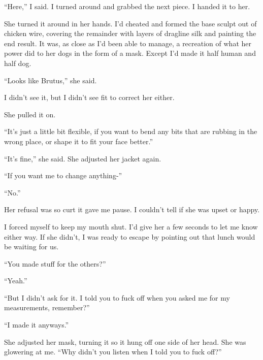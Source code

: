 ``Here,'' I said.  I turned around and grabbed the next piece.  I handed it to her.



She turned it around in her hands.  I'd cheated and formed the base sculpt out of chicken wire, covering the remainder with layers of dragline silk and painting the end result.  It was, as close as I'd been able to manage, a recreation of what her power did to her dogs in the form of a mask.  Except I'd made it half human and half dog.



``Looks like Brutus,'' she said.



I didn't see it, but I didn't see fit to correct her either.



She pulled it on.



``It's just a little bit flexible, if you want to bend any bits that are rubbing in the wrong place, or shape it to fit your face better.''



``It's fine,'' she said.  She adjusted her jacket again.



``If you want me to change anything-''



``No.''



Her refusal was so curt it gave me pause.  I couldn't tell if she was upset or happy.



I forced myself to keep my mouth shut.  I'd give her a few seconds to let me know either way.  If she didn't, I was ready to escape by pointing out that lunch would be waiting for us.



``You made stuff for the others?''



``Yeah.''



``But I didn't ask for it.  I told you to fuck off when you asked me for my measurements, remember?''



``I made it anyways.''



She adjusted her mask, turning it so it hung off one side of her head.  She was glowering at me.  ``Why didn't you listen when I told you to fuck off?''




